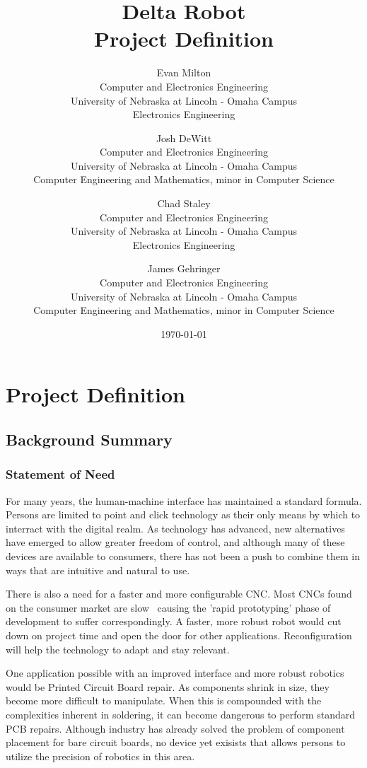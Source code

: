 \documentclass[11pt]{report}
\title{Delta Robot\\Project Definition}
\author{
Evan Milton\\
Computer and Electronics Engineering\\
University of Nebraska at Lincoln - Omaha Campus\\
Electronics Engineering
\and
Josh DeWitt\\
Computer and Electronics Engineering\\
University of Nebraska at Lincoln - Omaha Campus\\
Computer Engineering and Mathematics, minor in Computer Science
\and
Chad Staley\\
Computer and Electronics Engineering\\
University of Nebraska at Lincoln - Omaha Campus\\
Electronics Engineering
\and
James Gehringer\\
Computer and Electronics Engineering\\
University of Nebraska at Lincoln - Omaha Campus\\
Computer Engineering and Mathematics, minor in Computer Science
}
\date{\today}
\begin{document}
\maketitle
\tableofcontents

\chapter*{Project Definition}		%
\setcounter{chapter}{1}			%

\section{Background Summary}

\subsection{Statement of Need}
\par For many years, the human-machine interface has maintained a standard formula. Persons are limited to point and click technology as their only means by which to interract with the digital realm. As technology has advanced, new alternatives have emerged to allow  greater freedom of control, and although many of these devices are available to consumers, there has not been a push to combine them in ways that are intuitive and natural to use.

\par There is also a need for a faster and more configurable CNC. Most CNCs found on the consumer market are slow~ causing the 'rapid prototyping' phase of development to suffer correspondingly. A faster, more robust robot would cut down on project time and open the door for other applications. Reconfiguration will help the technology to adapt and stay relevant.

\par One application possible with an improved interface and more robust robotics would be Printed Circuit Board repair. As components shrink in size, they become more difficult to manipulate. When this is compounded with the complexities inherent in soldering, it can become dangerous to perform standard PCB repairs. Although industry has already solved the problem of component placement for bare circuit boards, no device yet exisists that allows persons to utilize the precision of robotics in this area. 
\end{document}
